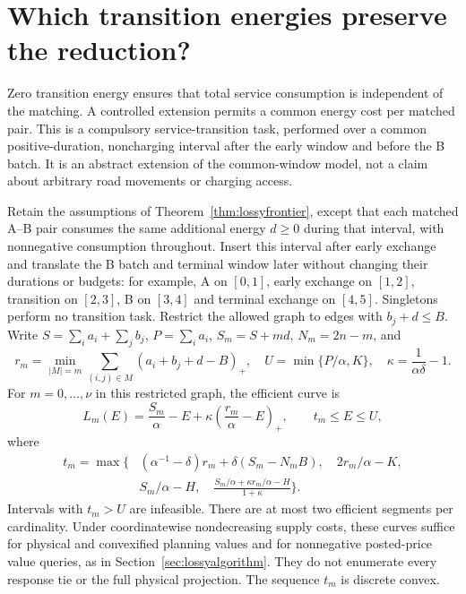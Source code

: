 \section{Which transition energies preserve the reduction?}
\label{sec:transitionenergy}
Zero transition energy ensures that total service consumption is independent
of the matching. A controlled extension permits a common energy cost per
matched pair. This is a compulsory service-transition task, performed over
a common positive-duration, noncharging interval after the early window
and before the B batch. It is an abstract extension of the common-window
model, not a claim about arbitrary road movements or charging access.

\begin{corollary}\label{cor:commontransition}
Retain the assumptions of Theorem~\ref{thm:lossyfrontier}, except that each
matched A--B pair consumes the same additional energy $d\ge0$ during that
interval, with nonnegative consumption throughout. Insert this interval
after early exchange and translate the B batch and terminal window later
without changing their durations or budgets: for example, A on $[0,1]$,
early exchange on $[1,2]$, transition on $[2,3]$, B on $[3,4]$ and terminal
exchange on $[4,5]$. Singletons perform no
transition task. Restrict the allowed graph to edges with $b_j+d\le B$.
Write $S=\sum_i a_i+\sum_j b_j$, $P=\sum_i a_i$,
$S_m=S+md$, $N_m=2n-m$, and
\[
 r_m=\min_{|M|=m}\sum_{(i,j)\in M}(a_i+b_j+d-B)_+,
 \quad U=\min\{P/\alpha,K\},
 \quad \kappa=\frac1{\alpha\delta}-1.
\]
For $m=0,\ldots,\nu$ in this restricted graph, the efficient curve is
\[
 L_m(E)=\frac{S_m}{\alpha}-E+
       \kappa\left(\frac{r_m}{\alpha}-E\right)_+,
 \qquad t_m\le E\le U,
\]
where
\begin{align*}
 t_m=\max\Biggl\{&
 (\alpha^{-1}-\delta)r_m+\delta(S_m-N_mB),\quad
 2r_m/\alpha-K,\\[-2pt]
 &S_m/\alpha-H,\quad
 \frac{S_m/\alpha+\kappa r_m/\alpha-H}{1+\kappa}
 \Biggr\}.
\end{align*}
Intervals with $t_m>U$ are infeasible. There are at most two efficient
segments per cardinality. Under coordinatewise nondecreasing supply costs,
these curves suffice for physical and convexified planning values and for
nonnegative posted-price value queries, as in
Section~\ref{sec:lossyalgorithm}. They do not enumerate every response tie
or the full physical projection. The sequence $t_m$ is discrete convex.
\end{corollary}

